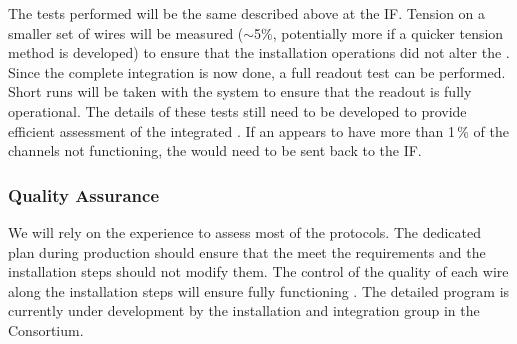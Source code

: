 
The tests performed will be the same described above at the IF. Tension on a smaller set of wires will be measured ($\sim$5\%, potentially more if a quicker tension method is developed) to ensure that the installation operations did not alter the . Since the complete integration is now done, a full readout test can be performed. Short runs will be taken with the  system to ensure that the readout is fully operational. The details of these tests still need to be developed to provide efficient assessment of the integrated . If an  appears to have more than \num{1}\,\% of the channels not functioning, the  would need to be sent back to the IF.

\subsubsection{Quality Assurance}

We will rely on the  experience to assess most of the  protocols. The dedicated  plan during production should ensure that the  meet the requirements and the installation steps should not modify them. The control of the quality of each wire along the installation steps will ensure fully functioning . The detailed  program is currently under development by the installation and integration group in the  Consortium.


